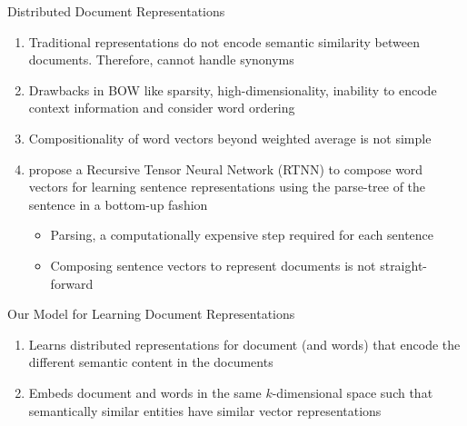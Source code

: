 \documentclass[10pt]{beamer}
\begin{document}
\begin{frame}{Distributed Document Representations}
\vfill {}
\begin{enumerate}
	\vfill\item<2-> Traditional representations do not encode semantic similarity between documents. Therefore, cannot handle synonyms
	\vfill\item<3-> Drawbacks in BOW like sparsity, high-dimensionality, inability to encode context information and consider word ordering
	\vfill\item<4-> Compositionality of word vectors beyond weighted average \cite{mitchell2010composition, zanzotto2010estimating, yessenalina2011compositional, grefenstette2013multi, mikolov2013distributed} is not simple
	\vfill\item<5-> \citet{socher2013recursive} propose a Recursive Tensor Neural Network (RTNN) to compose word vectors for learning sentence representations using the parse-tree of the sentence in a bottom-up fashion
	\begin{itemize}
		\vfill\item<6-> Parsing, a computationally expensive step required for each sentence
		\vfill\item<7-> Composing sentence vectors to represent documents is not straight-forward
	\end{itemize}
\end{enumerate}
\end{frame}



\begin{frame}{Our Model for Learning Document Representations}
\vfill {}
\vfill {}

\vfill {}
\begin{enumerate}
	\vfill\item<4-> Learns distributed representations for document (and words) that encode the different semantic content in the documents
	\vfill\item<5-> Embeds document and words in the same $k$-dimensional space such that semantically similar entities have similar vector representations
\end{enumerate}


\end{frame}
\end{document}

